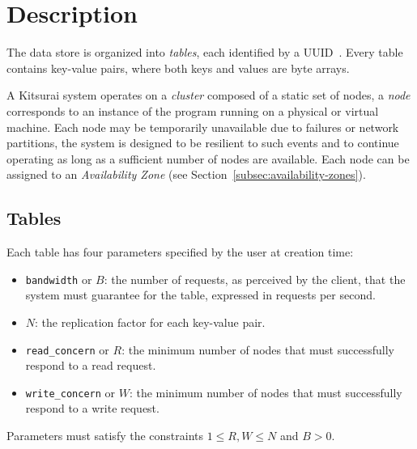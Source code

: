 \section{Description}
\label{sec:architecture}

%

The data store is organized into \emph{tables}, each identified by a
UUID~\cite{rfc9562}.
Every table contains key-value pairs, where both keys and values are byte
arrays.

A Kitsurai system operates on a \emph{cluster} composed of a static set of
nodes, a \emph{node} corresponds to an instance of the program running on a
physical or virtual machine.
Each node may be temporarily unavailable due to failures or network partitions,
the system is designed to be resilient to such events and to continue operating
as long as a sufficient number of nodes are available.
Each node can be assigned to an \emph{Availability Zone} (see
Section~\ref{subsec:availability-zones}).

\subsection{Tables}
\label{subsec:tables}

Each table has four parameters specified by the user at creation time:
\begin{itemize}
    \item \texttt{bandwidth} or $B$: the number of requests, as
        perceived by the client, that the system must guarantee for the table,
        expressed in requests per second.
    \item $N$: the replication factor for each key-value pair.
    \item \texttt{read\_concern} or $R$: the minimum number of nodes
        that must successfully respond to a read request.
    \item \texttt{write\_concern} or $W$: the minimum number of nodes
        that must successfully respond to a write request.
\end{itemize}

Parameters must satisfy the constraints $1 \leq R, W \leq N$ and $B > 0$.


